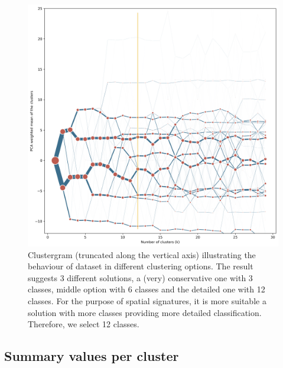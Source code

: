 \begin{figure}
    \includegraphics[width=\linewidth]{figures/clustergram_sin.png}
    \caption{Clustergram (truncated along the vertical axis) illustrating the behaviour
    of dataset in different clustering options. The result suggests 3 different
    solutions, a (very) conservative one with 3 classes, middle option with 6 classes
    and the detailed one with 12 classes. For the purpose of spatial signatures, it is
    more suitable a solution with more classes providing more detailed classification.
    Therefore, we select 12 classes.}
    \label{fig:cgram_sin}
\end{figure}

\subsection{Summary values per cluster}


